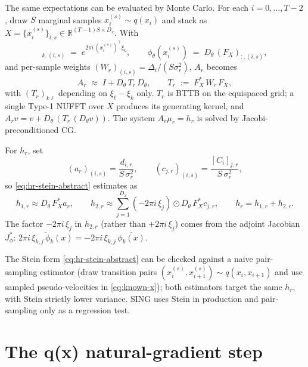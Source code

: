 \documentclass[11pt]{article}
\begin{document}
The same expectations can be evaluated by Monte Carlo. For each
$i=0,\ldots,T-2$, draw $S$ marginal samples $x_i^{(s)}\sim q(x_i)$ and
stack as $X=\{x_i^{(s)}\}_{i,s}\in\mathbb{R}^{(T-1)S\times D_x}$. With
\begin{equation}
[F_X]_{k,(i,s)} \;=\; e^{2\pi i\,(x_i^{(s)})^\top \xi_k},
\qquad
\phi_\theta(x_i^{(s)}) \;=\; D_\theta\,(F_X)_{:,(i,s)},
\end{equation}
and per-sample weights $(W_r)_{(i,s)} = \Delta_i/(S\sigma_r^2)$,
$A_r$ becomes
\begin{equation}
A_r \;\approx\; I + D_\theta\,T_r\,D_\theta,
\qquad
T_r \;:=\; F_X^{*}\,W_r\,F_X,
\end{equation}
with $(T_r)_{k\ell}$ depending on $\xi_\ell-\xi_k$ only. $T_r$ is BTTB on
the equispaced grid; a single Type-1 NUFFT over $X$ produces its generating
kernel, and $A_r v = v + D_\theta\,(T_r\,(D_\theta v))$. The system
$A_r\mu_r=h_r$ is solved by Jacobi-preconditioned CG.

For $h_r$, set
\begin{equation}
(a_r)_{(i,s)} = \frac{d_{i,r}}{S\,\sigma_r^2},
\qquad
(c_{j,r})_{(i,s)} = \frac{[C_i]_{j,r}}{S\,\sigma_r^2},
\end{equation}
so \eqref{eq:hr-stein-abstract} estimates as
\begin{equation}
h_{1,r} \approx D_\theta\, F_X^{*} a_r,
\qquad
h_{2,r} \approx \sum_{j=1}^{D_x} (-2\pi i\,\xi_j) \odot D_\theta\, F_X^{*} c_{j,r},
\qquad
h_r = h_{1,r} + h_{2,r}.
\label{eq:hr-mc}
\end{equation}
The factor $-2\pi i\,\xi_j$ in $h_{2,r}$ (rather than $+2\pi i\,\xi_j$)
comes from the adjoint Jacobian $J_\phi^{*}$:
$\overline{2\pi i\,\xi_{k,j}\,\phi_k(x)} = -2\pi i\,\xi_{k,j}\,\overline{\phi_k(x)}$.

The Stein form \eqref{eq:hr-stein-abstract} can be checked against a naive
pair-sampling estimator (draw transition pairs $(x_i^{(s)}, x_{i+1}^{(s)})
\sim q(x_i, x_{i+1})$ and use sampled pseudo-velocities in
\eqref{eq:known-x}); both estimators target the same $h_r$, with Stein
strictly lower variance. SING uses Stein in production and pair-sampling
only as a regression test.

\section{The q(x) natural-gradient step}
\label{sec:qx}
\end{document}
